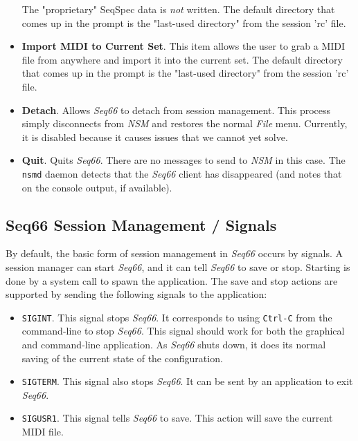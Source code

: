 \begin{itemize}
         The "proprietary" SeqSpec data is \textsl{not} written.
         The default directory that comes up in the
         prompt is the "last-used directory" from the session 'rc' file.
      \item \textbf{Import MIDI to Current Set}.
         This item allows the user to grab a MIDI file from anywhere and import
         it into the current set.
         The default directory that comes up in the
         prompt is the "last-used directory" from the session 'rc' file.
      \item \textbf{Detach}.
         Allows \textsl{Seq66} to detach from session management.
         This process simply disconnects from \textsl{NSM} and restores the
         normal \textsl{File} menu.
         Currently, it is disabled because it causes issues that we cannot yet
         solve.
      \item \textbf{Quit}.
         Quits \textsl{Seq66}.
         There are no messages to send to \textsl{NSM} in this case.
         The \texttt{nsmd} daemon detects that the \textsl{Seq66} client has
         disappeared (and notes that on the console output, if available).
   \end{itemize}

\subsection{Seq66 Session Management / Signals}
\label{subsec:sessions_signals}

   By default, the basic form of session management in
   \textsl{Seq66} occurs by signals.  A
   session manager can start \textsl{Seq66}, and it can tell \textsl{Seq66} to
   save or stop.  Starting is done by a system call to spawn the application.
   The save and stop actions are supported by sending the following signals to
   the application:

   \begin{itemize}
      \item \texttt{SIGINT}.
         This signal stops \textsl{Seq66}. It corresponds
         to using \texttt{Ctrl-C} from the command-line to stop \textsl{Seq66}.
         This signal should work for both the graphical and command-line
         application.  As \textsl{Seq66} shuts down, it does its normal saving
         of the current state of the configuration.
      \item \texttt{SIGTERM}.
         This signal also stops \textsl{Seq66}.  It can
         be sent by an application to exit \textsl{Seq66}.
      \item \texttt{SIGUSR1}.
         This signal tells \textsl{Seq66} to save.  This
         action will save the current MIDI file.
   \end{itemize}

